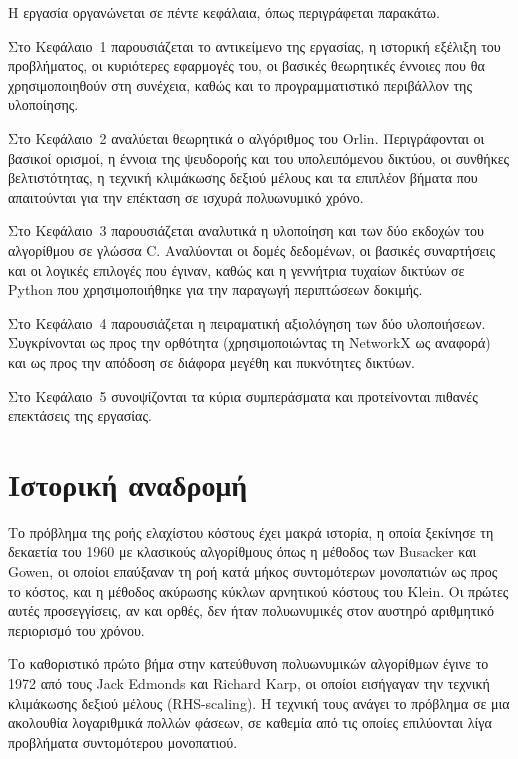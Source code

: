 \documentclass[11pt,a4paper,oneside]{report}
\begin{document}
Η εργασία οργανώνεται σε πέντε κεφάλαια, όπως περιγράφεται παρακάτω.

Στο Κεφάλαιο~1 παρουσιάζεται το αντικείμενο της εργασίας, η ιστορική εξέλιξη του προβλήματος, οι κυριότερες εφαρμογές του, οι βασικές θεωρητικές έννοιες που θα χρησιμοποιηθούν στη συνέχεια, καθώς και το προγραμματιστικό περιβάλλον της υλοποίησης.

Στο Κεφάλαιο~2 αναλύεται θεωρητικά ο αλγόριθμος του \textenglish{Orlin}. Περιγράφονται οι βασικοί ορισμοί, η έννοια της ψευδοροής και του υπολειπόμενου δικτύου, οι συνθήκες βελτιστότητας, η τεχνική κλιμάκωσης δεξιού μέλους και τα επιπλέον βήματα που απαιτούνται για την επέκταση σε ισχυρά πολυωνυμικό χρόνο.

Στο Κεφάλαιο~3 παρουσιάζεται αναλυτικά η υλοποίηση και των δύο εκδοχών του αλγορίθμου σε γλώσσα \textenglish{C}. Αναλύονται οι δομές δεδομένων, οι βασικές συναρτήσεις και οι λογικές επιλογές που έγιναν, καθώς και η γεννήτρια τυχαίων δικτύων σε \textenglish{Python} που χρησιμοποιήθηκε για την παραγωγή περιπτώσεων δοκιμής.

Στο Κεφάλαιο~4 παρουσιάζεται η πειραματική αξιολόγηση των δύο υλοποιήσεων. Συγκρίνονται ως προς την ορθότητα (χρησιμοποιώντας τη \textenglish{NetworkX} ως αναφορά) και ως προς την απόδοση σε διάφορα μεγέθη και πυκνότητες δικτύων.

Στο Κεφάλαιο~5 συνοψίζονται τα κύρια συμπεράσματα και προτείνονται πιθανές επεκτάσεις της εργασίας.

\section{Ιστορική αναδρομή}

Το πρόβλημα της ροής ελαχίστου κόστους έχει μακρά ιστορία, η οποία ξεκίνησε τη δεκαετία του 1960 με κλασικούς αλγορίθμους όπως η μέθοδος των \textenglish{Busacker} και \textenglish{Gowen}, οι οποίοι επαύξαναν τη ροή κατά μήκος συντομότερων μονοπατιών ως προς το κόστος, και η μέθοδος ακύρωσης κύκλων αρνητικού κόστους του \textenglish{Klein}. Οι πρώτες αυτές προσεγγίσεις, αν και ορθές, δεν ήταν πολυωνυμικές στον αυστηρό αριθμητικό περιορισμό του χρόνου.

Το καθοριστικό πρώτο βήμα στην κατεύθυνση πολυωνυμικών αλγορίθμων έγινε το 1972 από τους \textenglish{Jack Edmonds} και \textenglish{Richard Karp}, οι οποίοι εισήγαγαν την τεχνική κλιμάκωσης δεξιού μέλους (\textenglish{RHS-scaling}). Η τεχνική τους ανάγει το πρόβλημα σε μια ακολουθία λογαριθμικά πολλών φάσεων, σε καθεμία από τις οποίες επιλύονται λίγα προβλήματα συντομότερου μονοπατιού.
\end{document}
